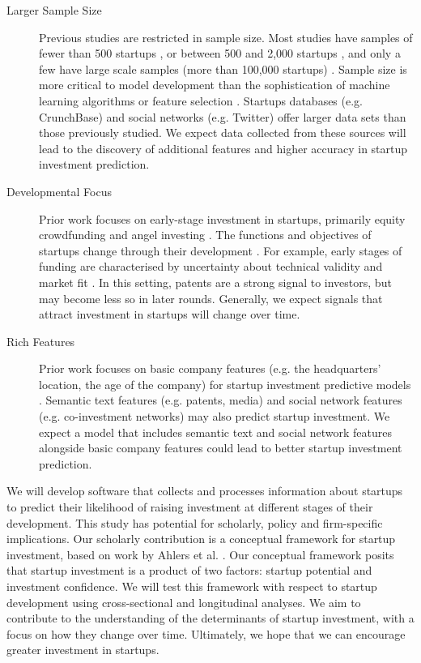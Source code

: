 \documentclass[../thesis/thesis.tex]{subfiles}
\begin{document}
\begin{description}

\item[Larger Sample Size]

Previous studies are restricted in sample size. Most studies have samples of fewer than 500 startups \cite{ahlers2015, gimmon2010}, or between 500 and 2,000 startups \cite{hoenen2014, yu2015, an2015, werth2013, croce2016}, and only a few have large scale samples (more than 100,000 startups) \cite{shan2014, cheng2016}. Sample size is more critical to model development than the sophistication of machine learning algorithms or feature selection \cite{caruana2008}. Startups databases (e.g. CrunchBase) and social networks (e.g. Twitter) offer larger data sets than those previously studied. We expect data collected from these sources will lead to the discovery of additional features and higher accuracy in startup investment prediction.

\item[Developmental Focus]

Prior work focuses on early-stage investment in startups, primarily equity crowdfunding \cite{beckwith2016, ahlers2015, cheng2016, yuan2016} and angel investing \cite{croce2016}. The functions and objectives of startups change through their development \cite{mcmullen2013}. For example, early stages of funding are characterised by uncertainty about technical validity and market fit \cite{hsu2008}. In this setting, patents are a strong signal to investors, but may become less so in later rounds. Generally, we expect signals that attract investment in startups will change over time.

\item[Rich Features]

Prior work focuses on basic company features (e.g. the headquarters' location, the age of the company) for startup investment predictive models \cite{beckwith2016, gimmon2010}. Semantic text features (e.g. patents, media) \cite{hoenen2014, yuan2016} and social network features (e.g. co-investment networks) \cite{werth2013, cheng2016, yu2015} may also predict startup investment. We expect a model that includes semantic text and social network features alongside basic company features could lead to better startup investment prediction.

\end{description}

We will develop software that collects and processes information about startups to predict their likelihood of raising investment at different stages of their development. This study has potential for scholarly, policy and firm-specific implications. Our scholarly contribution is a conceptual framework for startup investment, based on work by Ahlers et al. \cite{ahlers2015}. Our conceptual framework posits that startup investment is a product of two factors: startup potential and investment confidence. We will test this framework with respect to startup development using cross-sectional and longitudinal analyses. We aim to contribute to the understanding of the determinants of startup investment, with a focus on how they change over time. Ultimately, we hope that we can encourage greater investment in startups.
\end{document}
